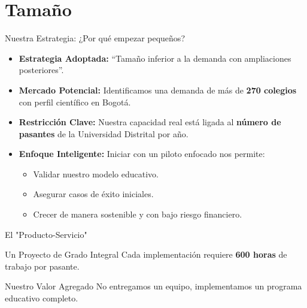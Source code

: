 \section{Tamaño}
\begin{frame}{Nuestra Estrategia: ¿Por qué empezar pequeños?}
    \begin{itemize}
        \item<1-> \textbf{Estrategia Adoptada:} ``Tamaño inferior a la demanda con ampliaciones posteriores''.
        \item<2-> \textbf{Mercado Potencial:} Identificamos una demanda de más de \textbf{270 colegios} con perfil científico en Bogotá.
        \item<3-> \textbf{Restricción Clave:} Nuestra capacidad real está ligada al \textbf{número de pasantes} de la Universidad Distrital por año.
        \item<4-> \textbf{Enfoque Inteligente:} Iniciar con un piloto enfocado nos permite:
        \begin{itemize}
            \item<5-> Validar nuestro modelo educativo.
            \item<6-> Asegurar casos de éxito iniciales.
            \item<7-> Crecer de manera sostenible y con bajo riesgo financiero.
        \end{itemize}
    \end{itemize}
\end{frame}



\begin{frame}{El "Producto-Servicio"}
    \begin{block}{Un Proyecto de Grado Integral}
        Cada implementación requiere \textbf{600 horas} de trabajo por pasante.
    \end{block}
    
    \vfill
    \begin{alertblock}{Nuestro Valor Agregado}
        No entregamos un equipo, implementamos un programa educativo completo.
    \end{alertblock}
\end{frame}



